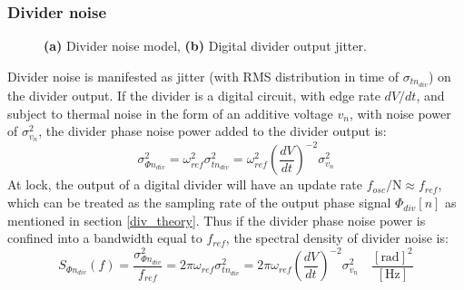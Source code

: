 \subsubsection{Divider noise}
	\begin{figure}[htb!]
	    \centering
	    \begin{subfigure}{0.5\textwidth}
	        \centering
	        
	        \caption{ }
	        \label{fig:div_pn_model}
	    \end{subfigure}%
	    \begin{subfigure}{0.5\textwidth}
	        \centering
	        
	        \caption{ }
	        \label{fig:div_jitter}
	    \end{subfigure}
	    \label{fig:div_pn}
	    \caption{\textbf{(a)} Divider noise model, \textbf{(b)} Digital divider output jitter.}
	\end{figure}
	\FloatBarrier
	Divider noise is manifested as jitter (with RMS distribution in time of $\sigma_{t n_{div}}$) on the divider output. If the divider is a digital circuit, with edge rate $dV/dt$, and subject to thermal noise in the form of an additive voltage $v_n$, with noise power of $\sigma_{v_n}^2$, the divider phase noise power added to the divider output is:
	\begin{equation}
		\sigma_{\Phi n_{div}}^2 = \omega^2_{ref}\sigma^2_{t n_{div}}  =\omega^2_{ref}\left(\frac{dV}{dt}\right)^{-2}\sigma_{v_n}^2
	\end{equation}
	At lock, the output of a digital divider will have an update rate $f_{{osc}}/\mathrm{N} \approx f_{ref}$, which can be treated as the sampling rate of the output phase signal $\Phi_{div}[n]$ as mentioned in section \ref{div_theory}. Thus if the divider phase noise power is confined into a bandwidth equal to $f_{ref}$, the spectral density of divider noise is:
	\begin{equation}
		S_{\Phi n_{div}}(f) = \frac{\sigma_{\Phi n_{div}}^2}{f_{ref}} = 2\pi\omega_{ref}\sigma^2_{t n_{div}}  =2\pi\omega_{ref}\left(\frac{dV}{dt}\right)^{-2}\sigma_{v_n}^2\hspace{1em}\frac{[\text{rad}]^2}{[\text{Hz}]}
	\end{equation}

